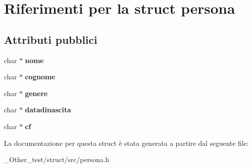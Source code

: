 \hypertarget{structpersona}{
\section{Riferimenti per la struct persona}
\label{structpersona}
}
\subsection*{Attributi pubblici}
\begin{DoxyCompactItemize}
\item 
\hypertarget{structpersona_a2ed3f97d34f345afe9db642281887d22}{
char $\ast$ {\bfseries nome}}
\label{structpersona_a2ed3f97d34f345afe9db642281887d22}

\item 
\hypertarget{structpersona_adadc0966a1e4a620eb46c8c44ddd8f24}{
char $\ast$ {\bfseries cognome}}
\label{structpersona_adadc0966a1e4a620eb46c8c44ddd8f24}

\item 
\hypertarget{structpersona_a6ba9d525cbf92d855c8438b20d65ac85}{
char $\ast$ {\bfseries genere}}
\label{structpersona_a6ba9d525cbf92d855c8438b20d65ac85}

\item 
\hypertarget{structpersona_a11b6798f8674cfa082e4d93707100409}{
char $\ast$ {\bfseries datadinascita}}
\label{structpersona_a11b6798f8674cfa082e4d93707100409}

\item 
\hypertarget{structpersona_ae612e20a7597c54001236ec435f6ad0b}{
char $\ast$ {\bfseries cf}}
\label{structpersona_ae612e20a7597c54001236ec435f6ad0b}

\end{DoxyCompactItemize}


La documentazione per questa struct è stata generata a partire dal seguente file:\begin{DoxyCompactItemize}
\item 
\_\-Other\_\-test/struct/src/persona.h\end{DoxyCompactItemize}
